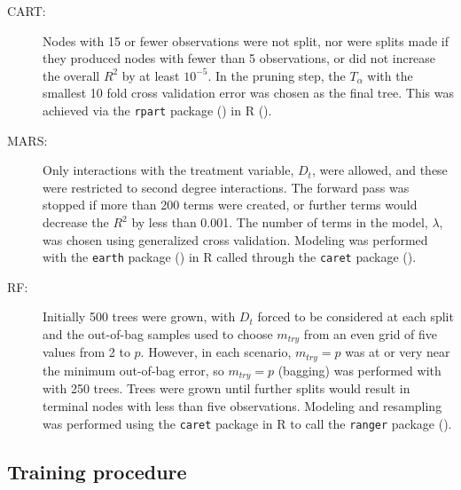 \documentclass[12pt]{article}
\begin{document}
\begin{description}
  \item [CART:] Nodes with 15 or fewer observations were not split, nor were splits made if they produced nodes with fewer than 5 observations, or did not increase the overall $R^2$ by at least $10^{-5}$.
  In the pruning step, the $T_{\alpha}$ with the smallest 10 fold cross validation error was chosen as the final tree. This was achieved via the \texttt{rpart} package (\cite{rpart}) in \textsf{R} (\cite{R}).
  \item [MARS:] Only interactions with the treatment variable, $D_{t}$, were allowed, and these were restricted to second degree interactions. The forward pass was stopped if more than 200 terms were created, or further terms would decrease the $R^2$ by less than 0.001. The number of terms in the model, $\lambda$, was chosen using generalized cross validation. Modeling was performed with the \texttt{earth} package (\cite{earth}) in \textsf{R} called through the \texttt{caret} package (\cite{caret}).
  \item [RF:] Initially 500 trees were grown, with $D_{t}$ forced to be considered at each split and the out-of-bag samples used to choose $m_{try}$ from an even grid of five values from 2 to $p$. However, in each scenario, $m_{try} = p$ was at or very near the minimum out-of-bag error, so $m_{try} = p$ (bagging) was performed with with 250 trees. Trees were grown until further splits would result in terminal nodes with less than five observations. Modeling and resampling was performed using the \texttt{caret} package in \textsf{R} to call the \texttt{ranger} package (\cite{ranger}).
\end{description}



\subsection{Training procedure} %
\label{sub:procedure}
\end{document}
